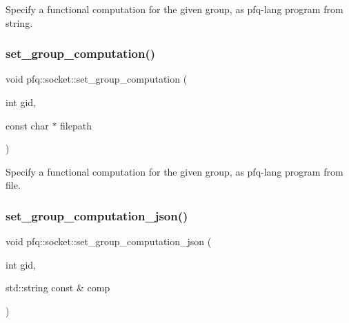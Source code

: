 Specify a functional computation for the given group, as pfq-\/lang program from string. 

\mbox{\label{classpfq_1_1socket_acb1eaaaadbcbbee8b5f2054b01e51fda}} 
\subsubsection{\texorpdfstring{set\+\_\+group\+\_\+computation()}{set\_group\_computation()}\hspace{0.1cm}{\footnotesize\ttfamily [4/4]}}
{\footnotesize\ttfamily void pfq\+::socket\+::set\+\_\+group\+\_\+computation (\begin{DoxyParamCaption}\item[{int}]{gid,  }\item[{const char $\ast$}]{filepath }\end{DoxyParamCaption})\hspace{0.3cm}{\ttfamily [inline]}}



Specify a functional computation for the given group, as pfq-\/lang program from file. 

\mbox{\label{classpfq_1_1socket_ac60650eec56374ac4be3c69b43255b85}} 
\subsubsection{\texorpdfstring{set\+\_\+group\+\_\+computation\+\_\+json()}{set\_group\_computation\_json()}}
{\footnotesize\ttfamily void pfq\+::socket\+::set\+\_\+group\+\_\+computation\+\_\+json (\begin{DoxyParamCaption}\item[{int}]{gid,  }\item[{std\+::string const \&}]{comp }\end{DoxyParamCaption})\hspace{0.3cm}{\ttfamily [inline]}}



